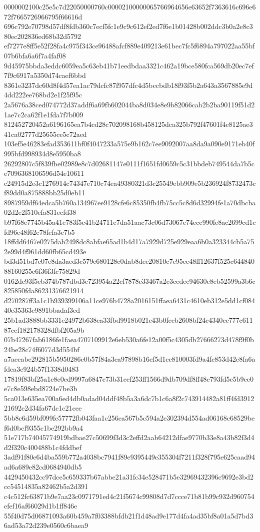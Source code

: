 {0000002100c25e5c7d22050000760c00002100000065766964656e63652f7363616c696e672f7665726966795f66616d
696c792e70798d57df8fdb360c7ecf5fc1e9c9c612ef2ed7f6e1b01428b002ddc3b0a2e8c380ec202836ed68b32d5792
ef7277e8ff5e52f28fa4c975f343ce96488afcf889e409213e61bec7fc5f6894a797022aa55bf07b6bfa6a6f7a4faf08
9d45975bbda3eddc6059ea5c63eb41b71eedbdaa3321c462a19bce580fca569db20ec7ef7f9c6917a5350d74caef6bbd
8361e3237dc60d8f4d57ea1ac79dcfc87f957dfc4d5bccbdb18f93f5b2a643a3567885e9d4dd222ee768bd2e1f25f95c
2a5676a38ced074772d37addf6a69fb602044ba8d034e8e9b82066cab2b2ba90119f51d21ae7c2ca62f1e1fda7f7b009
812452720452a6196165ea7b4cd28c702098168b458125dca325b792f47601f4e8125ae341ca02777d25655ce5c72aed
103ef5e46283efad353611bf0f4047233a575e9b162c7ee9092007aa8da9a090e9171eb40f995bfd998934d8e5950ba8
26292807c5f839fbe02989e8c7d02681147e0111f1651fd0659c5c31bbdeb749544da7b5ce7096368106596d54e10611
c24915d2e3c1276914c74347e710c74ea49380321d3c25549ebb909e5b236924f8732473cf89dd0a875888bb25d0eb11
8987959df64edca5b760a134967ee9128cfe6c85350fb4fb75cc5c8d6d32994fe1a70dbcba02d2e2f510efa831ecfd38
b97f68e7745b45a41e783f5c41b24711e7da51aac73c06d73067e74ece990fe8ac2699cd1cfd96e48f62e78fefa3e7b5
18ffdd6467e0275dab2498dc8abfae65ad1b4d17a7929d725e929eaa6b0a323344cb5a752e99d4f961dd60fb65cd493e
bd3d51bd7c07e8da3aed3c579e680128c0dab8dee20810c7e95ee48ff12637f525c64484088160255c6f36f3fc75829d
0162dc93f5eb374b787dbd3e723954a22cf7878c33467a2c3cedee94630e8eb52599a3b6c825850fda86231376621914
d270287ff3a1c1b939399106a11ce976b4728a2016151ffaea6431c4610eb312e5dd1cf08440e35363e9891bbadaf3ed
25b1ad3888bb3331e24972b638ea33fbd9918b021c43b0feeb2608bf24c4340cc777c61187eef182178328dfbf205a9b
07b47267fab6186fe1faea4707109912e6eb530a6fe12a00f5c4305db27666273d478f9f0b24be28c74f6077d3d554bf
a7aecabe292815b5950286e0b57f84a3ea97898b16cf5d1ce810003fd9a4fc853d42e8fa6afdea3c924b57f1338d0483
17819f83bf25a1e8c0ed9997a6847c73b31eef253ff1566d9db709df8ff48e793fd5e5b9ec0e7c8e598ebd8724e7be3b
5ca013e635ea700a6ed4db0adad04ddf48b5a3a6dc7b1c6a8f2c743914482a81ff4fd391221692c2d34fa67dc1c21cee
5bb8c6d59bf099fe57772fb043faa1c256ea567b5c594a2e302394d554ad06168c68529bef6d0bcf9355c1be292bb9a4
51e717b74045774919bdbae27c50699f3d3c2effd2aab64212dfae9770b33e8a43b82f3d4d2f320c400488b1c4fddbef
3adf91f80e6d4ba559b772a4038bc7941f89e9395449e355304f7211f328f795e625caad94ad6a689e82cd0684940db5
4429450432cc97dce5c659337b67abbe21a31fc34e528471b5e32969432396c9692e3bd2cc54514835a82462b5a2d391
c4c512fc63871b9e7aa23c0971791ed4c21f5674c99808d7d7ccce71b81b99c932d960754efef16af66029d1b1ff846e
55f40d75d06871093a60b459a7f03388bfdb21f1d48ad9e177d4fa4ad35bf8a01a5d7bd36ad53a72d239e0560c6baea9
}
